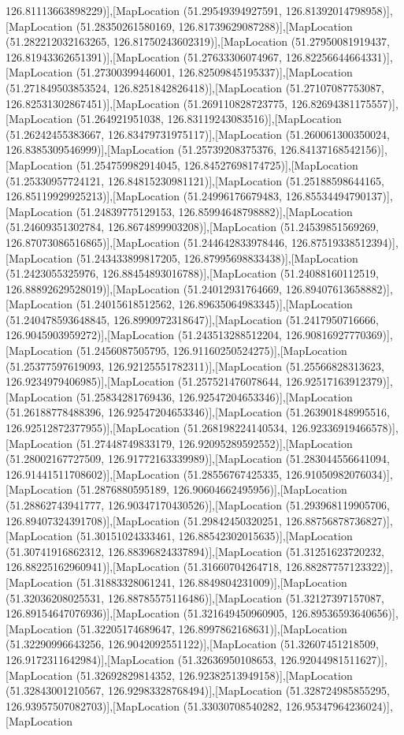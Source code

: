 126.81113663898229)],[MapLocation (51.29549394927591, 126.81392014798958)],[MapLocation (51.28350261580169, 126.81739629087288)],[MapLocation (51.282212032163265, 126.81750243602319)],[MapLocation (51.27950081919437, 126.81943362651391)],[MapLocation (51.27633306074967, 126.82256644664331)],[MapLocation (51.27300399446001, 126.82509845195337)],[MapLocation (51.271849503853524, 126.8251842826418)],[MapLocation (51.27107087753087, 126.82531302867451)],[MapLocation (51.269110828723775, 126.82694381175557)],[MapLocation (51.264921951038, 126.83119243083516)],[MapLocation (51.26242455383667, 126.83479731975117)],[MapLocation (51.260061300350024, 126.8385309546999)],[MapLocation (51.25739208375376, 126.84137168542156)],[MapLocation (51.254759982914045, 126.84527698174725)],[MapLocation (51.25330957724121, 126.84815230981121)],[MapLocation (51.25188598644165, 126.85119929925213)],[MapLocation (51.24996176679483, 126.85534494790137)],[MapLocation (51.24839775129153, 126.85994648798882)],[MapLocation (51.24609351302784, 126.8674899903208)],[MapLocation (51.24539851569269, 126.87073086516865)],[MapLocation (51.244642833978446, 126.87519338512394)],[MapLocation (51.243433899817205, 126.87995698833438)],[MapLocation (51.2423055325976, 126.88454893016788)],[MapLocation (51.24088160112519, 126.88892629528019)],[MapLocation (51.24012931764669, 126.89407613658882)],[MapLocation (51.24015618512562, 126.89635064983345)],[MapLocation (51.240478593648845, 126.8990972318647)],[MapLocation (51.2417950716666, 126.9045903959272)],[MapLocation (51.243513288512204, 126.90816927770369)],[MapLocation (51.2456087505795, 126.91160250524275)],[MapLocation (51.25377597619093, 126.92125551782311)],[MapLocation (51.25566828313623, 126.9234979406985)],[MapLocation (51.257521476078644, 126.92517163912379)],[MapLocation (51.25834281769436, 126.92547204653346)],[MapLocation (51.26188778488396, 126.92547204653346)],[MapLocation (51.263901848995516, 126.92512872377955)],[MapLocation (51.268198224140534, 126.92336919466578)],[MapLocation (51.27448749833179, 126.92095289592552)],[MapLocation (51.28002167727509, 126.91772163339989)],[MapLocation (51.283044556641094, 126.91441511708602)],[MapLocation (51.28556767425335, 126.91050982076034)],[MapLocation (51.2876880595189, 126.90604662495956)],[MapLocation (51.28862743941777, 126.90347170430526)],[MapLocation (51.293968119905706, 126.89407324391708)],[MapLocation (51.29842450320251, 126.88756878736827)],[MapLocation (51.30151024333461, 126.88542302015635)],[MapLocation (51.30741916862312, 126.88396824337894)],[MapLocation (51.31251623720232, 126.88225162960941)],[MapLocation (51.31660704264718, 126.88287757123322)],[MapLocation (51.31883328061241, 126.8849804231009)],[MapLocation (51.32036208025531, 126.88785575116486)],[MapLocation (51.32127397157087, 126.89154647076936)],[MapLocation (51.321649450960905, 126.89536593640656)],[MapLocation (51.32205174689647, 126.8997862168631)],[MapLocation (51.32290996643256, 126.9042092551122)],[MapLocation (51.32607451218509, 126.9172311642984)],[MapLocation (51.32636950108653, 126.92044981511627)],[MapLocation (51.32692829814352, 126.92382513949158)],[MapLocation (51.32843001210567, 126.92983328768494)],[MapLocation (51.328724985855295, 126.93957507082703)],[MapLocation (51.33030708540282, 126.95347964236024)],[MapLocation 